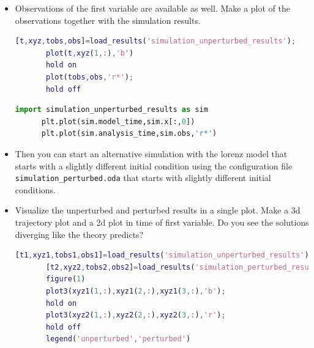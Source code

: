 \begin{itemize}
      To create a time-series plot in Matlab type:
      \begin{lstlisting}[language=Matlab,frame=single,caption={Matlab}]
       subplot(2,1,1);
       plot(t,states(1,:),'b-');
       ylabel('\theta_1');
       subplot(2,1,2);
       plot(t,states(2,:),'b-');
       ylabel('\theta_2');
       xlabel('time');
      \end{lstlisting}
      
      To create a time-series plot in Python type:
      \begin{lstlisting}[language=Python,frame=single,caption={Python}]
      plt.subplot(2,1,1)
      plt.plot(sim.model_time,sim.x[:,0],'b') #python counts starting at 0
      plt.ylabel(r'$\theta_1$') # use raw string and latex for label
      plt.subplot(2,1,2)
      plt.plot(sim.model_time,sim.x[:,1],'b')
      plt.ylabel(r'$\theta_2$')
      plt.show() #only needed if interactive plotting is off. Set with plt.ioff(), plt.ion()
      \end{lstlisting}
%

\item Observations of the first variable are available as well. Make a plot of
      the observations together with the simulation results.
      \begin{lstlisting}[language=Matlab,frame=single,caption={Matlab}]
      [t,xyz,tobs,obs]=load_results('simulation_unperturbed_results');
       plot(t,xyz(1,:),'b')
       hold on
       plot(tobs,obs,'r*');
       hold off
      \end{lstlisting}
      \begin{lstlisting}[language=Python,frame=single,caption={Python}]
      import simulation_unperturbed_results as sim
      plt.plot(sim.model_time,sim.x[:,0])
      plt.plot(sim.analysis_time,sim.obs,'r*')
      \end{lstlisting}

\item Then you can start an alternative simulation with the lorenz model that
       starts with a slightly different initial condition using the
       configuration file \texttt{ simulation\_perturbed.oda} that starts with
       slightly different initial conditions.

\item  Visualize the unperturbed and perturbed results in a single plot. Make
       a 3d trajectory plot and a 2d plot in time of first variable. Do you see
       the solutions diverging like the theory predicts?
      \begin{lstlisting}[language=Matlab,frame=single,caption={Matlab}]
       [t1,xyz1,tobs1,obs1]=load_results('simulation_unperturbed_results');
       [t2,xyz2,tobs2,obs2]=load_results('simulation_perturbed_results');
       figure(1)
       plot3(xyz1(1,:),xyz1(2,:),xyz1(3,:),'b');
       hold on
       plot3(xyz2(1,:),xyz2(2,:),xyz2(3,:),'r');
       hold off
       legend('unperturbed','perturbed')


\end{lstlisting}
\end{itemize}
